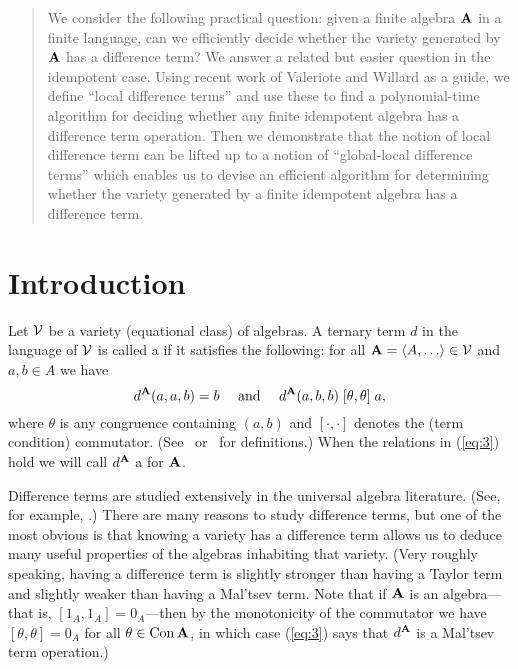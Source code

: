 \begin{abstract}
We consider the following practical question: given a finite algebra $\mathbf{A}$ in a
finite language, can we efficiently decide whether the variety generated by
$\mathbf{A}$ has a difference term?  We answer a related but easier question in the
idempotent case. Using recent work of Valeriote and Willard as a guide, we
define ``local difference terms'' 
and use these to find a polynomial-time algorithm for
deciding whether any finite idempotent algebra has a difference term operation.
Then we demonstrate that the notion of local difference term can be lifted up
to a notion of ``global-local difference terms'' which enables us to
devise an efficient algorithm for determining whether the
variety generated by a finite idempotent algebra has a difference term. 
\end{abstract}

\section{Introduction}
\label{sec:introduction}
Let $\mathcal{V}$ be a variety (equational class) of algebras.
A ternary term $d$ in the language of $\mathcal{V}$ is called 
a  if it satisfies the following:
for all $\bA = \<A, \dots \> \in \sV$ and $a, b \in A$ we have
\begin{equation}
\label{eq:3}  
d^{\mathbf{A}}(a,a,b) = b \quad \text{ and } \quad
d^{\mathbf{A}}(a,b,b) \mathrel{[\theta, \theta]} a,
\end{equation}
where $\theta$ is any congruence %
containing $(a,b)$
and $[\cdot, \cdot]$ denotes the (term condition) commutator.
(See~\cite{HM:1988} or~\cite{MR3076179} for definitions.)
When the relations in (\ref{eq:3}) hold we will call $d^{\mathbf{A}}$
a  for $\mathbf{A}$.

Difference terms are studied extensively in the universal algebra literature.
(See, for example, \cite{HM:1988,MR1358491,MR3076179,MR1663558,MR3449235,KSW}.)
There are many reasons to study difference terms, but
one of the most obvious is that knowing a variety 
has a difference term allows us to deduce many useful
properties of the algebras inhabiting that variety.
(Very roughly speaking, having a difference term is slightly stronger than having
a Taylor term and slightly weaker than having a Mal'tsev term.
Note that if
$\mathbf{A}$ is an  algebra---that is, $[1_A, 1_A] = 0_A$---then by
the monotonicity of the commutator we have
$[\theta, \theta] = 0_A$ for all $\theta \in \operatorname{Con} \mathbf{A}$, in which case
(\ref{eq:3}) says that $d^{\mathbf{A}}$ is a Mal'tsev term operation.)

